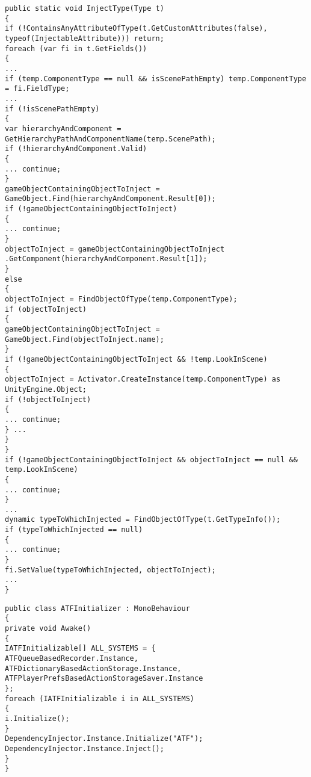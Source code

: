 \begin{lstlisting}[caption={Метод инъекции зависимостей в экземпляр класса типа},label=injectType]
public static void InjectType(Type t)
{
if (!ContainsAnyAttributeOfType(t.GetCustomAttributes(false), typeof(InjectableAttribute))) return;
foreach (var fi in t.GetFields())
{
...
if (temp.ComponentType == null && isScenePathEmpty) temp.ComponentType = fi.FieldType;
...
if (!isScenePathEmpty)
{
var hierarchyAndComponent = GetHierarchyPathAndComponentName(temp.ScenePath);
if (!hierarchyAndComponent.Valid)
{
... continue;
} 
gameObjectContainingObjectToInject = GameObject.Find(hierarchyAndComponent.Result[0]);
if (!gameObjectContainingObjectToInject)
{
... continue;
}
objectToInject = gameObjectContainingObjectToInject
.GetComponent(hierarchyAndComponent.Result[1]);
}
else
{
objectToInject = FindObjectOfType(temp.ComponentType);
if (objectToInject)
{
gameObjectContainingObjectToInject = GameObject.Find(objectToInject.name);
}
if (!gameObjectContainingObjectToInject && !temp.LookInScene)
{
objectToInject = Activator.CreateInstance(temp.ComponentType) as UnityEngine.Object;
if (!objectToInject)
{
... continue;
} ...
}
}
if (!gameObjectContainingObjectToInject && objectToInject == null && temp.LookInScene)
{
... continue;
}
...
dynamic typeToWhichInjected = FindObjectOfType(t.GetTypeInfo());
if (typeToWhichInjected == null)
{
... continue;
}
fi.SetValue(typeToWhichInjected, objectToInject);
...
}
\end{lstlisting}

\begin{lstlisting}[caption={Бизнес-логика базовой системы интеграции},label=initializer]
public class ATFInitializer : MonoBehaviour
{
private void Awake()
{
IATFInitializable[] ALL_SYSTEMS = {
ATFQueueBasedRecorder.Instance, 
ATFDictionaryBasedActionStorage.Instance,
ATFPlayerPrefsBasedActionStorageSaver.Instance
};
foreach (IATFInitializable i in ALL_SYSTEMS)
{
i.Initialize();
}
DependencyInjector.Instance.Initialize("ATF");
DependencyInjector.Instance.Inject();
}
}
\end{lstlisting}

